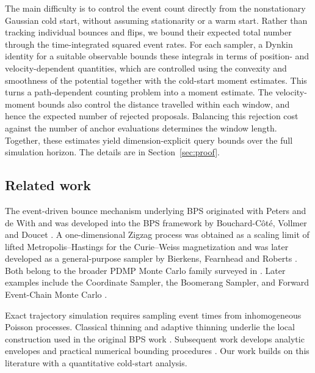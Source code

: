\documentclass{amsart}
\theoremstyle{plain}
\theoremstyle{definition}
\theoremstyle{remark}
\newcommand{\1}{\mathbf 1}
\begin{document}
The main difficulty is to control the event count directly from the nonstationary Gaussian cold start, without assuming stationarity or a warm start. Rather than tracking individual bounces and flips, we bound their expected total number through the time-integrated squared event rates. For each sampler, a Dynkin identity for a suitable observable bounds these integrals in terms of position- and velocity-dependent quantities, which are controlled using the convexity and smoothness of the potential together with the cold-start moment estimates. This turns a path-dependent counting problem into a moment estimate. The velocity-moment bounds also control the distance travelled within each window, and hence the expected number of rejected proposals. Balancing this rejection cost against the number of anchor evaluations determines the window length. Together, these estimates yield dimension-explicit query bounds over the full simulation horizon. The details are in Section~\ref{sec:proof}.

\subsection*{Related work}

The event-driven bounce mechanism underlying BPS originated with Peters and
de With
\cite{PetersDeWith2012} and was developed into the BPS framework by
Bouchard-C\^ot\'e, Vollmer and Doucet
\cite{BouchardCoteVollmerDoucet}.  A one-dimensional Zigzag process was
obtained as a scaling limit of lifted Metropolis--Hastings for the Curie--Weiss magnetization
\cite{BierkensRoberts2017} and was later developed as a general-purpose
sampler by Bierkens, Fearnhead and Roberts
\cite{BierkensFearnheadRoberts}.  Both belong to the broader PDMP Monte Carlo
family surveyed in \cite{FearnheadEtAl2018}.  Later examples include the
Coordinate Sampler, the Boomerang Sampler, and Forward Event-Chain Monte Carlo
\cite{WuRobertCoordinate,BierkensEtAlBoomerang,MichelDurmusSenecal}.

Exact trajectory simulation requires sampling event times from inhomogeneous
Poisson processes.  Classical thinning \cite{LewisShedler1979} and adaptive
thinning \cite{Ogata1981} underlie the local construction used in the original
BPS work \cite{BouchardCoteVollmerDoucet}.  Subsequent work develops analytic
envelopes \cite{SuttonFearnhead2023} and practical numerical bounding procedures
\cite{CorbellaSpencerRoberts2022,AndralKamatani2024}. Our work builds on this literature with a quantitative cold-start analysis.
\end{document}
